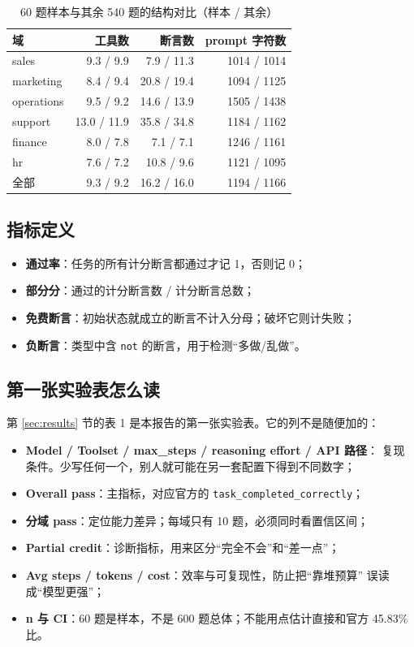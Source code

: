 \documentclass[UTF8,a4paper,11pt]{ctexart}
\begin{document}
\begin{table}[htbp]
\centering
\small
\caption{60 题样本与其余 540 题的结构对比（样本 / 其余）}
\label{tab:sample}
\begin{tabular}{lrrr}
\toprule
域 & 工具数 & 断言数 & prompt 字符数 \\
\midrule
sales & 9.3 / 9.9 & 7.9 / 11.3 & 1014 / 1014 \\
marketing & 8.4 / 9.4 & 20.8 / 19.4 & 1094 / 1125 \\
operations & 9.5 / 9.2 & 14.6 / 13.9 & 1505 / 1438 \\
support & 13.0 / 11.9 & 35.8 / 34.8 & 1184 / 1162 \\
finance & 8.0 / 7.8 & 7.1 / 7.1 & 1246 / 1161 \\
hr & 7.6 / 7.2 & 10.8 / 9.6 & 1121 / 1095 \\
\midrule
全部 & 9.3 / 9.2 & 16.2 / 16.0 & 1194 / 1166 \\
\bottomrule
\end{tabular}
\end{table}

\subsection{指标定义}

\begin{itemize}
  \item \textbf{通过率}：任务的所有计分断言都通过才记 1，否则记 0；
  \item \textbf{部分分}：通过的计分断言数 / 计分断言总数；
  \item \textbf{免费断言}：初始状态就成立的断言不计入分母；破坏它则计失败；
  \item \textbf{负断言}：类型中含 \texttt{not} 的断言，用于检测“多做/乱做”。
\end{itemize}

\subsection{第一张实验表怎么读}

第 \ref{sec:results} 节的表 1 是本报告的第一张实验表。它的列不是随便加的：

\begin{itemize}
  \item \textbf{Model / Toolset / max\_steps / reasoning effort / API 路径}：
  复现条件。少写任何一个，别人就可能在另一套配置下得到不同数字；
  \item \textbf{Overall pass}：主指标，对应官方的 \texttt{task\_completed\_correctly}；
  \item \textbf{分域 pass}：定位能力差异；每域只有 10 题，必须同时看置信区间；
  \item \textbf{Partial credit}：诊断指标，用来区分“完全不会”和“差一点”；
  \item \textbf{Avg steps / tokens / cost}：效率与可复现性，防止把“靠堆预算”
  误读成“模型更强”；
  \item \textbf{n 与 CI}：60 题是样本，不是 600 题总体；不能用点估计直接和官方
  45.83\% 比。
\end{itemize}
\end{document}
